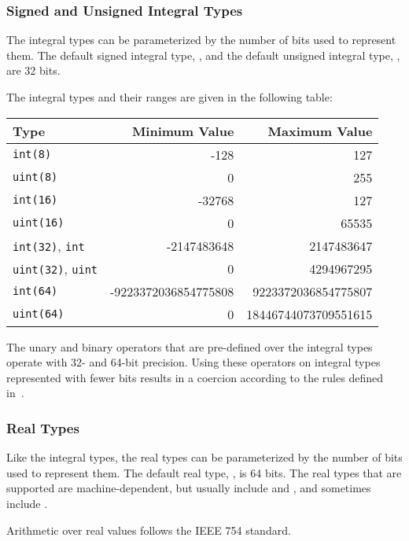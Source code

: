 \subsubsection{Signed and Unsigned Integral Types}
\label{Signed_and_Unsigned_Integral_Types}

The integral types can be parameterized by the number of bits used to
represent them.  The default signed integral type, , and the
default unsigned integral type, , are 32 bits.

The integral types and their ranges are given in the following table:

\begin{center}
\begin{tabular}{|l|r|r|}
\hline
{\bf Type} & {\bf Minimum Value} & {\bf Maximum Value} \\
\hline
{\tt int(8)} & -128 & 127 \\
{\tt uint(8)} & 0 & 255 \\
{\tt int(16)} & -32768 & 127 \\
{\tt uint(16)} & 0 & 65535 \\
{\tt int(32)}, {\tt int} & -2147483648 & 2147483647 \\
{\tt uint(32)}, {\tt uint} & 0 & 4294967295 \\
{\tt int(64)} & -9223372036854775808 & 9223372036854775807 \\
{\tt uint(64)} & 0 & 18446744073709551615 \\
\hline
\end{tabular}
\end{center}

The unary and binary operators that are pre-defined over the integral
types operate with 32- and 64-bit precision.  Using these operators on
integral types represented with fewer bits results in a coercion
according to the rules defined in~.

\subsubsection{Real Types}
\label{Real_Types}

Like the integral types, the real types can be parameterized by the
number of bits used to represent them.  The default real
type, , is 64 bits.  The real types that are supported are
machine-dependent, but usually include 
and , and sometimes include .

Arithmetic over real values follows the IEEE 754 standard.

